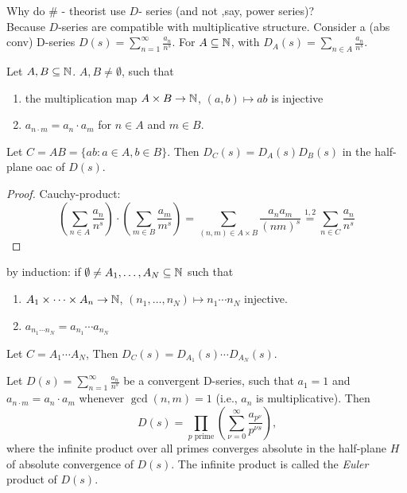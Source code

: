 \documentclass[NumTh.tex]{subfiles}
\begin{document}
Why do \# - theorist use $D$- series (and not ,say, power series)?\\
Because $D$-series are compatible with multiplicative structure.
Consider a (abs conv) D-series $D(s) = \sum_{n=1}^\infty \frac{a_n}{n^s}$.
For $A \subseteq \mathbb{N}$, with $D_A(s) = \sum_{n \in A} \frac{a_n}{n^s}$.

\begin{lemma}\label{4_6}
  Let $A,B \subseteq \mathbb{N}$. $A,B \neq \emptyset$, such that
  \begin{enumerate}
    \item the multiplication map $A \times B \to \mathbb{N}$, $(a,b) \mapsto ab$ is injective
    \item $a_{n \cdot m} = a_n \cdot a_m$ for $n \in A$ and $m \in B$.
  \end{enumerate}
  Let $C = AB = \{ ab : a \in A, b \in B \}$. Then $D_C(s) = D_A(s) D_B(s)$ in the half-plane oac of $D(s)$.
\end{lemma}

\begin{proof}
  Cauchy-product: 
  \[ \left( \sum_{n \in A} \frac{a_n}{n^s} \right) \cdot \left( \sum_{m \in B} \frac{a_m}{m^s} \right) = \sum_{(n,m) \in A \times B} \frac{a_n a_m}{(nm)^s} \overset{1,2}{=} \sum_{n \in C} \frac{a_n}{n^s} \]
\end{proof}

\begin{rem}
  by induction: if $\emptyset \neq A_1,\dots , A_N \subseteq \mathbb{N}$ such that
  \begin{enumerate}
    \item $A_1 \times \dots \times A_n \to \mathbb{N}$, $(n_1,\dots,n_N) \mapsto n_1 \cdots n_N$ injective.
    \item $a_{n_1 \cdots n_N} = a_{n_1} \cdots a_{n_N}$
  \end{enumerate}
  Let $C = A_1 \cdots A_N$, Then $D_C(s) = D_{A_1}(s) \cdots D_{A_N}(s)$.
\end{rem}

\begin{theorem}\label{4_7}
  Let $D(s) = \sum_{n=1}^\infty \frac{a_n}{n^s}$ be a convergent D-series, such that $a_1 = 1$ and $a_{n \cdot m} = a_n \cdot a_m$ whenever $\gcd(n,m) = 1$ (i.e., $a_n$ is multiplicative).
  Then 
  \[ D(s) = \prod_{p \text{ prime}} \left( \sum_{\nu = 0}^\infty \frac{a_{p^\nu}}{p^{\nu s}} \right) \text{,} \]
  where the infinite product over all primes converges absolute in the half-plane $H$ of absolute convergence of $D(s)$.
  The infinite product is called the \emph{Euler} product of $D(s)$.
\end{theorem}
\end{document}
